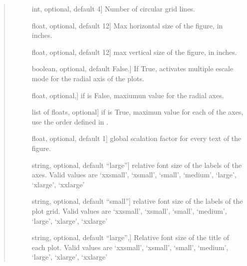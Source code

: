 \documentclass[letterpaper,10pt,english]{sphinxmanual}
\begin{document}
\begin{fulllineitems}
\begin{quote}
\begin{description}
\begin{description}
\item[{}] \leavevmode{[}int, optional, default 4{]}
Number of circular grid lines.

\item[{}] \leavevmode{[}float, optional, default 12{]}
Max horizontal size of the figure, in inches.

\item[{}] \leavevmode{[}float, optional, default 12{]}
max vertical size of the figure, in inches.

\item[{}] \leavevmode{[}boolean, optional, default False.{]}
If True, activates multiple escale mode 
for the radial axis of the plots.

\item[{}] \leavevmode{[}float, optional,{]}
if  is False, maxiumun value for the radial axes.

\item[{}] \leavevmode{[}list of floats, optional{]}
if  is True, maximun value for each 
of the axes, use the order defined in .

\item[{}] \leavevmode{[}float, optional, default 1{]}
global scalation factor for every text of the figure.

\item[{}] \leavevmode{[}string, optional, default “large”{]}
relative font size of the labels of the axes. 
Valid values are  ‘xx\sphinxhyphen{}small’, ‘x\sphinxhyphen{}small’, ‘small’, 
‘medium’, ‘large’, ‘x\sphinxhyphen{}large’, ‘xx\sphinxhyphen{}large’

\item[{}] \leavevmode{[}string, optional, default “small”{]}
relative font size of the labels of the plot grid. 
Valid values are  ‘xx\sphinxhyphen{}small’, ‘x\sphinxhyphen{}small’, ‘small’, 
‘medium’, ‘large’, ‘x\sphinxhyphen{}large’, ‘xx\sphinxhyphen{}large’

\item[{}] \leavevmode{[}string, optional, default “large”,{]}
Relative font size of the title of each plot. 
Valid values are  ‘xx\sphinxhyphen{}small’, ‘x\sphinxhyphen{}small’, ‘small’, 
‘medium’, ‘large’, ‘x\sphinxhyphen{}large’, ‘xx\sphinxhyphen{}large’


\end{description}
\end{description}
\end{quote}
\end{fulllineitems}
\end{document}
